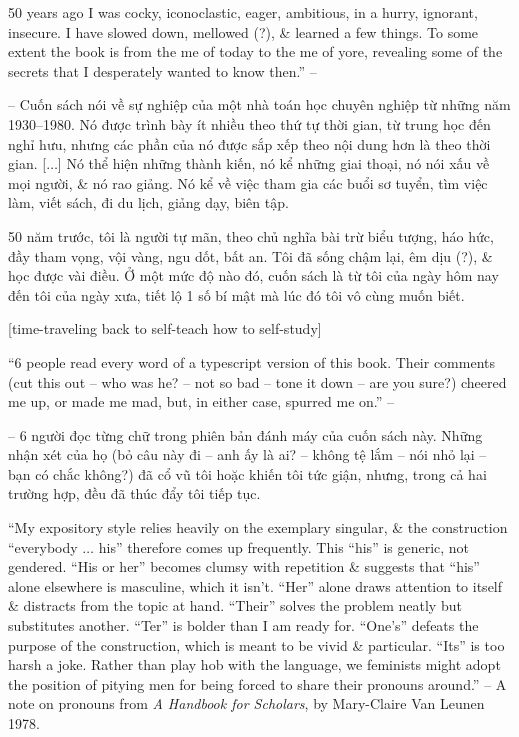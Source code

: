 \documentclass{article}
\begin{document}
\begin{enumerate}
	50 years ago I was cocky, iconoclastic, eager, ambitious, in a hurry, ignorant, insecure. I have slowed down, mellowed (?), \& learned a few things. To some extent the book is from the me of today to the me of yore, revealing some of the secrets that I desperately wanted to know then.'' -- \cite[Overture]{Halmos1985}
	
	-- Cuốn sách nói về sự nghiệp của một nhà toán học chuyên nghiệp từ những năm 1930--1980. Nó được trình bày ít nhiều theo thứ tự thời gian, từ trung học đến nghỉ hưu, nhưng các phần của nó được sắp xếp theo nội dung hơn là theo thời gian. [$\ldots$] Nó thể hiện những thành kiến, nó kể những giai thoại, nó nói xấu về mọi người, \& nó rao giảng. Nó kể về việc tham gia các buổi sơ tuyển, tìm việc làm, viết sách, đi du lịch, giảng dạy, biên tập.
	
	50 năm trước, tôi là người tự mãn, theo chủ nghĩa bài trừ biểu tượng, háo hức, đầy tham vọng, vội vàng, ngu dốt, bất an. Tôi đã sống chậm lại, êm dịu (?), \& học được vài điều. Ở một mức độ nào đó, cuốn sách là từ tôi của ngày hôm nay đến tôi của ngày xưa, tiết lộ 1 số bí mật mà lúc đó tôi vô cùng muốn biết. 
	
	[time-traveling back to self-teach how to self-study]
	
	``6 people read every word of a typescript version of this book. Their comments (cut this out -- who was he? -- not so bad -- tone it down -- are you sure?) cheered me up, or made me mad, but, in either case, spurred me on.'' -- \cite[Thanks]{Halmos1985}
	
	-- 6 người đọc từng chữ trong phiên bản đánh máy của cuốn sách này. Những nhận xét của họ (bỏ câu này đi -- anh ấy là ai? -- không tệ lắm -- nói nhỏ lại -- bạn có chắc không?) đã cổ vũ tôi hoặc khiến tôi tức giận, nhưng, trong cả hai trường hợp, đều đã thúc đẩy tôi tiếp tục.
	
	``My expository style relies heavily on the exemplary singular, \& the construction ``everybody $\ldots$ his'' therefore comes up frequently. This ``his'' is	generic, not gendered. ``His or her'' becomes clumsy with repetition \& suggests that ``his'' alone elsewhere is masculine, which it isn't. ``Her'' alone draws attention to itself \& distracts from the topic at hand. ``Their'' solves the problem neatly but substitutes another. ``Ter'' is bolder than I am ready for. ``One's'' defeats the purpose of the construction, which is meant to be vivid \& particular. ``Its'' is too harsh a joke. Rather than play hob with the language, we feminists might adopt the position of pitying men for being forced to share their pronouns around.'' -- A note on pronouns from {\it A Handbook for Scholars}, by {\sc Mary-Claire Van Leunen} 1978.
	

\end{enumerate}
\end{document}
